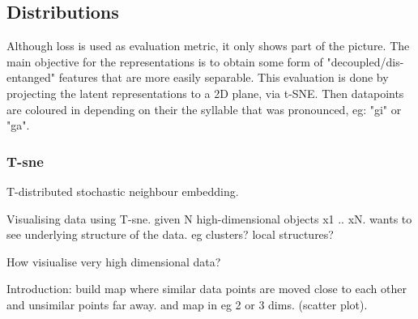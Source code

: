 	\subsection{Distributions}
	
		
	
	
		Although loss is used as evaluation metric, it only shows part of the picture. The main objective for the representations is to obtain some form of "decoupled/dis-entanged" features that are more easily separable. This evaluation is done by projecting the latent representations to a 2D plane, via t-SNE. Then datapoints are coloured in depending on their the syllable that was pronounced, eg: "gi" or "ga".
		
		
	
	
	
	\subsubsection{T-sne}
	T-distributed stochastic neighbour embedding.
	
	
	Visualising data using T-sne.
	given N high-dimensional objects x1 .. xN. wants to see underlying structure of the data. eg clusters? local structures?
	
	How visiualise very high dimensional data?
	
	Introduction:
		build map where similar data points are moved close to each other and unsimilar points far away. and map in eg 2 or 3 dims. (scatter plot).
		
		
	
	
	
	
